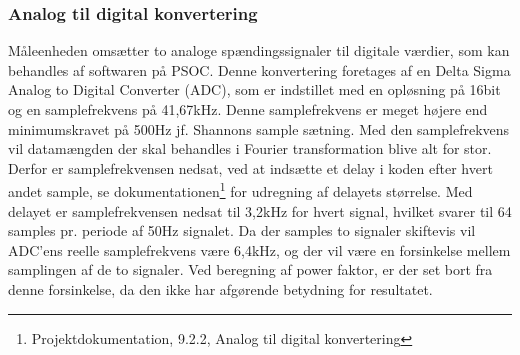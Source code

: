 
\subsubsection{Analog til digital konvertering}
Måleenheden omsætter to analoge spændingssignaler til digitale værdier, som kan behandles af softwaren på PSOC. Denne konvertering foretages af en Delta Sigma Analog to Digital Converter (ADC), som er indstillet med en opløsning på 16bit og en samplefrekvens på 41,67kHz. Denne samplefrekvens er meget højere end minimumskravet på 500Hz jf. Shannons sample sætning. Med den samplefrekvens vil datamængden der skal behandles i Fourier transformation blive alt for stor. Derfor er samplefrekvensen nedsat, ved at indsætte et delay i koden efter hvert andet sample, se dokumentationen\footnote{Projektdokumentation, 9.2.2, Analog til digital konvertering} for udregning af delayets størrelse. Med delayet er samplefrekvensen nedsat til 3,2kHz for hvert signal, hvilket svarer til 64 samples pr. periode af 50Hz signalet. Da der samples to signaler skiftevis vil ADC'ens reelle samplefrekvens være 6,4kHz, og der vil være en forsinkelse mellem samplingen af de to signaler. Ved beregning af power faktor, er der set bort fra denne forsinkelse, da den ikke har afgørende betydning for resultatet.  
